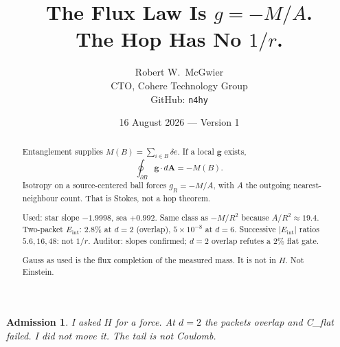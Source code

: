 \documentclass[11pt]{article}
\title{\textbf{The Flux Law Is $g=-M/A$.\\
The Hop Has No $1/r$.}}
\author{Robert W.\ McGwier\\
\small CTO, Cohere Technology Group\\
\small GitHub: \texttt{n4hy}}
\date{16 August 2026 --- Version 1}
\newtheorem*{admission}{Admission}
\begin{document}
\maketitle

\begin{abstract}
\noindent
Entanglement supplies $M(B)=\sum_{i\in B}\delta e$.
If a local $\mathbf{g}$ exists,
\[
\oint_{\partial B}\mathbf{g}\cdot d\mathbf{A}=-M(B).
\]
Isotropy on a source-centered ball forces $g_R=-M/A$,
with $A$ the outgoing nearest-neighbour count.
That is Stokes, not a hop theorem.

Used: star slope $-1.9998$, sea $+0.992$.
Same class as $-M/R^2$ because $A/R^2\approx 19.4$.
Two-packet $E_{\mathrm{int}}$: $2.8\%$ at $d=2$
(overlap), $5\times 10^{-8}$ at $d=6$.
Successive $\lvert E_{\mathrm{int}}\rvert$ ratios
$5.6,16,48$: not $1/r$. Auditor: slopes confirmed;
$d=2$ overlap refutes a $2\%$ flat gate.

Gauss as used is the flux completion of the
measured mass. It is not in $H$. Not Einstein.
\end{abstract}

\begin{admission}
I asked $H$ for a force. At $d=2$ the packets
overlap and C\_flat failed. I did not move it.
The tail is not Coulomb.
\end{admission}
\end{document}
